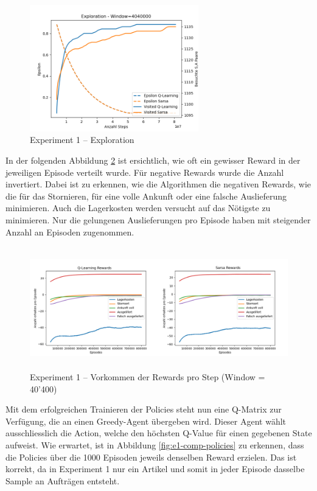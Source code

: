 \begin{figure}[H]
  \centering
  \includegraphics[height=5.5cm]{img/plots/exp-1/both_exploration.png}
  \caption{Experiment 1 – Exploration}
    \label{fig:e1-expl-both}
\end{figure}
In der folgenden Abbildung \ref{fig:e1-reward-freq} ist ersichtlich, wie oft ein gewisser Reward in der jeweiligen Episode verteilt wurde. Für negative Rewards wurde die Anzahl invertiert. Dabei ist zu erkennen, wie die Algorithmen die negativen Rewards, wie die für das Stornieren, für eine volle Ankunft oder eine falsche Auslieferung minimieren. Auch die Lagerkosten werden versucht auf das Nötigste zu minimieren. Nur die gelungenen Auslieferungen pro Episode haben mit steigender Anzahl an Episoden zugenommen.
\begin{figure}[H]
  \centering
  \includegraphics[height=5.3cm]{img/plots/exp-1/reward_frequency.png}
  \caption{Experiment 1 – Vorkommen der Rewards pro Step (Window = 40'400)}
    \label{fig:e1-reward-freq}
\end{figure}
Mit dem erfolgreichen Trainieren der Policies steht nun eine Q-Matrix zur Verfügung, die an einen Greedy-Agent übergeben wird. Dieser Agent wählt ausschliesslich die Action, welche den höchsten Q-Value für einen gegebenen State aufweist. Wie erwartet, ist in Abbildung \ref{fig:e1-comp-policies} zu erkennen, dass die Policies über die 1000 Episoden jeweils denselben Reward erzielen. Das ist korrekt, da in Experiment 1 nur ein Artikel und somit in jeder Episode dasselbe Sample an Aufträgen entsteht.
